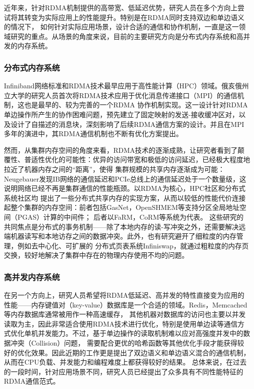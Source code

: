 近年来，针对RDMA机制提供的高带宽、低延迟优势，研究人员在多个方向上尝试将其转变为实际应用上的性能提升。特别是在RDMA同时支持双边和单边语义的情况下，
如何针对实际应用场景，设计合适的通信和协作机制，一直是这一领域研究的重点。从场景的角度来说，目前的主要研究方向是分布式内存系统和高并发的内存系统。

\subsubsection{分布式内存系统}

Infiniband网络标准和RDMA技术最早应用于高性能计算（HPC）领域。俄亥俄州立大学的研究人员\cite{liu2004high}首次将RDMA技术应用于优化消息传递接口（MPI）的通信机制，这也是最早的、较为完善的一个RDMA
协作机制实现。这一设计针对RDMA单边操作所产生的协作困难问题，预先建立了固定映射的发送-接收缓冲区对，以及设计了自描述的消息块，深刻影响了后续RDMA通信方案的设计\cite{mitchell2013using}\cite{kalia2014using}\cite{su2017rfp}。并且在MPI
多年的演进中，其RDMA通信机制也不断有优化方案提出\cite{sur2006rdma}\cite{wang2013gpu}。

然而，从集群内存空间的角度来看，RDMA技术的逐渐成熟，让研究者看到了颠覆性、普适性优化的可能性：优异的访问带宽和极低的访问延迟，已经极大程度地拉近了机器内存之间的“距离”，使得
集群规模的共享内存逐渐成为可能：Neugebauer\cite{neugebauer2018understanding}发现IB网络的通信延迟和PCIe总线上的通信延迟处于一个数量级，这说明网络已经不再是集群通信的性能瓶颈。以RDMA为核心，HPC社区和分布式系统社区均
提出了一些分布式共享内存的实现方案，从而以较低的性能代价连接起整个集群的内存空间：前者包括GasNet\cite{bonachea2017gasnet}，OpenSHMEM\cite{chapman2010introducing}等支持分区全局地址空间（PGAS）计算的中间件；
后者以FaRM\cite{dragojevic2014farm}，CoRM\cite{taranov2021corm}等系统为代表。
这些研究的共同焦点是分布式的事务机制——除了本地内存的读-写冲突之外，还需要解决远端机器读写和本地访存之间的数据冲突。此外，也有研究避开了细粒度的内存管理，例如去中心化、可扩展的
分布式页表系统Infiniswap\cite{gu2017efficient}，就通过粗粒度的内存页交换，较好地解决了集群中存在的物理内存使用不均的问题。

\subsubsection{高并发内存系统}

在另一个方向上，研究人员希望将RDMA低延迟、高并发的特性直接变为应用的性能——内存键值对（key-value）数据库是一个合适的领域。Redis\cite{redis}，Memcached\cite{jose2011memcached}等内存数据库通常被用作一种高速缓存，
其他机器对数据库的访问也主要以并发读取为主，因此非常适合使用RDMA技术进行优化，特别是使用单边读等通信方式优化单机并发能力\cite{mitchell2013using}。不过，基于单边操作的读取机制难以应对高强度并发中的数据冲突（Collision）问题，
需要配合更优的哈希函数\cite{pagh2004cuckoo}等其他优化手段才能获得较好的优化效果。因此近期的工作更是提出了双边语义和单边语义混合的通信机制\cite{kalia2014using}\cite{su2017rfp}，从而在CPU负载、并发能力和编程难度上都获得较好的结果。
总体来说，在过去的一段时间，针对应用场景不同，研究人员已经提出了众多具有不同性能特征的RDMA通信范式\cite{li2021hatrpc}。

